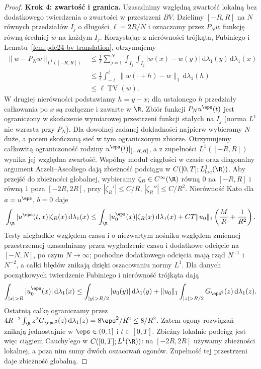 \begin{proof}
\textbf{Krok 4: zwartość i granica.}
Uzasadnimy względną zwartość lokalną bez dodatkowego
twierdzenia o zwartości w przestrzeni $BV$.
Dzielimy $[-R,R]$ na $N$ równych przedziałów $I_j$
o długości $\ell=2R/N$ i oznaczamy przez $P_Nw$
funkcję równą średniej $w$ na każdym $I_j$.
Korzystając z nierówności trójkąta, Fubiniego
i Lematu~\ref{lem:pde24-bv-translation}, otrzymujemy
\[
 \begin{aligned}
 \|w-P_Nw\|_{L^1([-R,R])}
 &\le \frac1\ell\sum_{j=1}^N
 \int_{I_j}\!\int_{I_j}|w(x)-w(y)|\,
 \mathrm d\lambda_1(y)\,\mathrm d\lambda_1(x)\\
 &\le\frac1\ell\int_{-\ell}^{\ell}
    \|w(\cdot+h)-w\|_1\,\mathrm d\lambda_1(h)\\
 &\le\ell\operatorname{TV}(w).
 \end{aligned}
\]
W drugiej nierówności podstawiamy $h=y-x$;
dla ustalonego $h$ przedziały całkowania po $x$
są rozłączne i zawarte w $\R$.
Zbiór funkcji $P_Nu^\eps(t)$ jest ograniczony
w skończenie wymiarowej przestrzeni funkcji
stałych na $I_j$ (norma $L^1$ nie wzrasta przy $P_N$).
Dla dowolnej zadanej dokładności najpierw wybieramy
$N$ duże, a potem skończoną sieć w tym ograniczonym
zbiorze. Otrzymujemy całkowitą ograniczoność rodziny
$u^\eps(t)|_{[-R,R]}$, a z zupełności $L^1([-R,R])$
wynika jej względna zwartość. Wspólny moduł ciągłości w
czasie oraz diagonalny argument Arzeli--Ascoliego dają
zbieżność podciągu w $C([0,T];L^1_{\mathrm{loc}}(\R))$.
Aby przejść do zbieżności globalnej, wybieramy
$\zeta_R\in C^\infty(\R)$ równą $0$ na $[-R,R]$ i
równą $1$ poza $[-2R,2R]$, przy
$|\zeta_R'|\le C/R$, $|\zeta_R''|\le C/R^2$.
Nierówność Kato dla $a=u^\eps$, $b=0$ daje
\[
 \int_\R|u^\eps(t,x)|\zeta_R(x)\,\mathrm d\lambda_1(x)
 \le\int_\R|u_0^\eps(x)|\zeta_R(x)\,\mathrm d\lambda_1(x)
 +CT\|u_0\|_1\left(\frac M R+\frac1{R^2}\right).
\]
Testy niegładkie względem czasu i o niezwartym
nośniku względem zmiennej przestrzennej uzasadniamy przez wygładzenie czasu i dodatkowe
odcięcie na $[-N,N]$, po czym $N\to\infty$; pochodne
dodatkowego odcięcia mają rząd $N^{-1}$ i $N^{-2}$,
a całki błędów znikają dzięki oszacowaniu normy $L^1$.
Dla danych początkowych twierdzenie Fubiniego
i nierówność trójkąta dają
\[
 \int_{|x|>R}|u_0^\eps(x)|\,\mathrm d\lambda_1(x)
 \le\int_{|y|>R/2}|u_0(y)|\,\mathrm d\lambda_1(y)
 +\|u_0\|_1\int_{|z|>R/2}G_{\eps^2}(z)\,
      \mathrm d\lambda_1(z).
\]
Ostatnią całkę ograniczamy przez
$4R^{-2}\int_\R z^2G_{\eps^2}(z)\,
\mathrm d\lambda_1(z)=8\eps^2/R^2\le8/R^2$.
Zatem ogony rozwiązań znikają jednostajnie
w $\eps\in(0,1]$ i $t\in[0,T]$. Zbieżny lokalnie
podciąg jest więc ciągiem Cauchy'ego w
$C([0,T];L^1(\R))$: na $[-2R,2R]$ używamy zbieżności
lokalnej, a poza nim sumy dwóch oszacowań ogonów.
Zupełność tej przestrzeni daje zbieżność globalną.


\end{proof}
